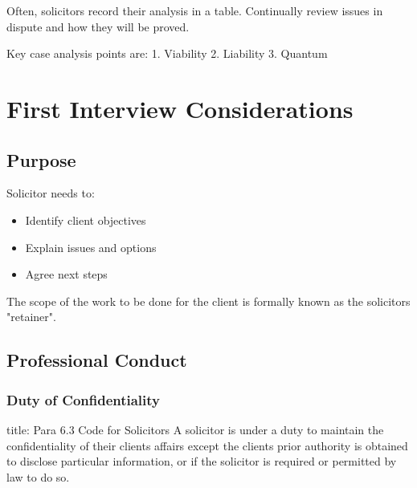 \documentclass[
]{article}
\newenvironment{Shaded}{}{}
\newcommand{\NormalTok}[1]{#1}
\providecommand{\tightlist}{%
  \setlength{\itemsep}{0pt}\setlength{\parskip}{0pt}}
\begin{document}
Often, solicitors record their analysis in a table. Continually review
issues in dispute and how they will be proved.

\begin{Shaded}
\begin{Highlighting}[]
\NormalTok{Key case analysis points are:}
\NormalTok{1. Viability}
\NormalTok{2. Liability}
\NormalTok{3. Quantum}
\end{Highlighting}
\end{Shaded}

\hypertarget{first-interview-considerations}{%
\section{First Interview
Considerations}\label{first-interview-considerations}}

\hypertarget{purpose}{%
\subsection{Purpose}\label{purpose}}

Solicitor needs to:

\begin{itemize}
\tightlist
\item
  Identify client objectives
\item
  Explain issues and options
\item
  Agree next steps
\end{itemize}

\begin{Shaded}
\begin{Highlighting}[]
\NormalTok{The scope of the work to be done for the client is formally known as the solicitor\textquotesingle{}s "retainer".  }
\end{Highlighting}
\end{Shaded}

\hypertarget{professional-conduct-1}{%
\subsection{Professional Conduct}\label{professional-conduct-1}}

\hypertarget{duty-of-confidentiality}{%
\subsubsection{Duty of Confidentiality}\label{duty-of-confidentiality}}

\begin{Shaded}
\begin{Highlighting}[]
\NormalTok{title: Para 6.3 Code for Solicitors}
\NormalTok{A solicitor is under a duty to maintain the confidentiality of their client\textquotesingle{}s affairs except the client\textquotesingle{}s prior authority is obtained to disclose particular information, or if the solicitor is required or permitted by law to do so. }
\end{Highlighting}
\end{Shaded}
\end{document}
